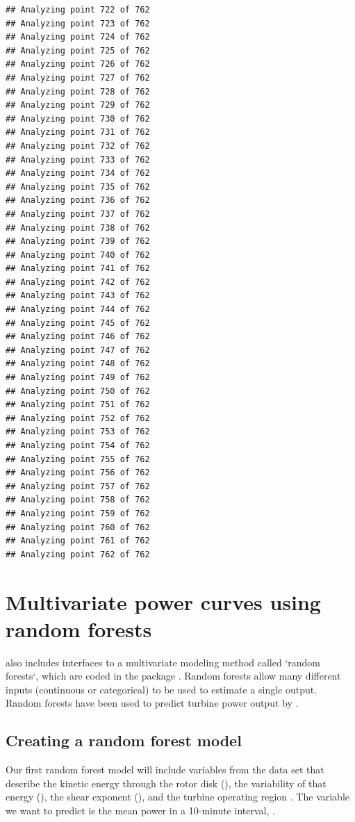 \documentclass[nojss]{jss}\usepackage[]{graphicx}\usepackage[]{color}
\makeatletter
\newenvironment{kframe}{%
 \def\at@end@of@kframe{}%
 \ifinner\ifhmode%
  \def\at@end@of@kframe{\end{minipage}}%
  \begin{minipage}{\columnwidth}%
 \fi\fi%
 \def\FrameCommand##1{\hskip\@totalleftmargin \hskip-\fboxsep
 \colorbox{shadecolor}{##1}\hskip-\fboxsep
     \hskip-\linewidth \hskip-\@totalleftmargin \hskip\columnwidth}%
 \MakeFramed {\advance\hsize-\width
   \@totalleftmargin\z@ \linewidth\hsize
   \@setminipage}}%
 {\par\unskip\endMakeFramed%
 \at@end@of@kframe}
\newenvironment{knitrout}{}{} %
\newcommand{\pname}{PowerPerformance}
\makeatother
\begin{document}
\begin{knitrout}
\begin{kframe}
\begin{verbatim}
## Analyzing point 722 of 762 
## Analyzing point 723 of 762 
## Analyzing point 724 of 762 
## Analyzing point 725 of 762 
## Analyzing point 726 of 762 
## Analyzing point 727 of 762 
## Analyzing point 728 of 762 
## Analyzing point 729 of 762 
## Analyzing point 730 of 762 
## Analyzing point 731 of 762 
## Analyzing point 732 of 762 
## Analyzing point 733 of 762 
## Analyzing point 734 of 762 
## Analyzing point 735 of 762 
## Analyzing point 736 of 762 
## Analyzing point 737 of 762 
## Analyzing point 738 of 762 
## Analyzing point 739 of 762 
## Analyzing point 740 of 762 
## Analyzing point 741 of 762 
## Analyzing point 742 of 762 
## Analyzing point 743 of 762 
## Analyzing point 744 of 762 
## Analyzing point 745 of 762 
## Analyzing point 746 of 762 
## Analyzing point 747 of 762 
## Analyzing point 748 of 762 
## Analyzing point 749 of 762 
## Analyzing point 750 of 762 
## Analyzing point 751 of 762 
## Analyzing point 752 of 762 
## Analyzing point 753 of 762 
## Analyzing point 754 of 762 
## Analyzing point 755 of 762 
## Analyzing point 756 of 762 
## Analyzing point 757 of 762 
## Analyzing point 758 of 762 
## Analyzing point 759 of 762 
## Analyzing point 760 of 762 
## Analyzing point 761 of 762 
## Analyzing point 762 of 762
\end{verbatim}
\end{kframe}
\end{knitrout}

\section{Multivariate power curves using random forests}
\pkg{\pname} also includes interfaces to a multivariate modeling method called `random forests`, which are coded in the package  \citep{Liaw_2002_a}. Random forests allow many different inputs (continuous or categorical) to be used to estimate a single output. Random forests have been used to predict turbine power output by \cite{Clifton_2013_a, Clifton_2013_d}.

\subsection{Creating a random forest model}
Our first random forest model will include variables from the  data set that describe the kinetic energy through the rotor disk (), the variability of that energy (), the shear exponent (), and the turbine operating region . The variable we want to predict is the mean power in a 10-minute interval, .
\end{document}

